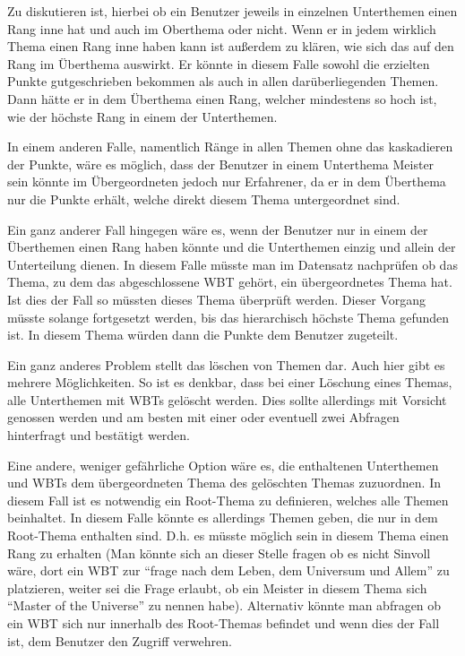 Zu diskutieren ist, hierbei ob ein Benutzer jeweils in einzelnen Unterthemen
einen Rang inne hat und auch im Oberthema oder nicht. Wenn er in jedem wirklich
Thema einen Rang inne haben kann ist außerdem zu klären, wie sich das auf den
Rang im Überthema auswirkt. Er könnte in diesem Falle sowohl die erzielten
Punkte gutgeschrieben bekommen als auch in allen darüberliegenden Themen. Dann
hätte er in dem Überthema einen Rang, welcher mindestens so hoch ist, wie der
höchste Rang in einem der Unterthemen.
 
In einem anderen Falle, namentlich Ränge in allen Themen ohne das kaskadieren
der Punkte, wäre es möglich, dass der Benutzer in einem Unterthema Meister sein
könnte im Übergeordneten jedoch nur Erfahrener, da er in dem Überthema nur die
Punkte erhält, welche direkt diesem Thema untergeordnet sind.

Ein ganz anderer Fall hingegen wäre es, wenn der Benutzer nur in einem der
Überthemen einen Rang haben könnte und die Unterthemen einzig und allein der
Unterteilung dienen. In diesem Falle müsste man im Datensatz nachprüfen ob das
Thema, zu dem das abgeschlossene WBT gehört, ein übergeordnetes Thema hat. Ist
dies der Fall so müssten dieses Thema überprüft werden. Dieser Vorgang müsste
solange fortgesetzt werden, bis das hierarchisch höchste Thema gefunden ist.
In diesem Thema würden dann die Punkte dem Benutzer zugeteilt.

Ein ganz anderes Problem stellt das löschen von Themen dar. Auch hier gibt es
mehrere Möglichkeiten. So ist es denkbar, dass bei einer Löschung eines Themas,
alle Unterthemen mit WBTs gelöscht werden. Dies sollte allerdings mit Vorsicht
genossen werden und am besten mit einer oder eventuell zwei Abfragen hinterfragt
und bestätigt werden.

Eine andere, weniger gefährliche Option wäre es, die enthaltenen Unterthemen und
WBTs dem übergeordneten Thema des gelöschten Themas zuzuordnen. In diesem Fall
ist es notwendig ein Root-Thema zu definieren, welches alle Themen beinhaltet.
In diesem Falle könnte es allerdings Themen geben, die nur in dem Root-Thema
enthalten sind. D.h. es müsste möglich sein in diesem Thema einen Rang
zu erhalten (Man könnte sich an dieser Stelle fragen ob es nicht Sinvoll wäre,
dort ein WBT zur "`frage nach dem Leben, dem Universum und Allem"' zu
platzieren, weiter sei die Frage erlaubt, ob ein Meister in diesem Thema sich
``Master of the Universe'' zu nennen habe). Alternativ könnte man abfragen ob
ein WBT sich nur innerhalb des Root-Themas befindet und wenn dies der Fall ist,
dem Benutzer den Zugriff verwehren.  

